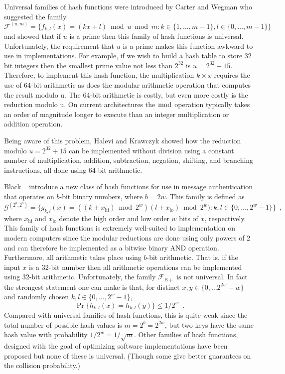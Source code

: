 \documentclass[lotsofwhite,charterfonts]{patmorin}
\begin{document}
Universal families of hash functions were introduced by Carter and
Wegman \cite{cwXX} who suggested the family
\[
\mathcal{F}^{(u,m)} = \{f_{k,l}(x)=(kx+l)\bmod u\bmod m  :
k\in\{1,\ldots,m-1\}, l\in\{0,\ldots,m-1\} \}
\]
and showed that if $u$ is a prime then this family of hash functions
is universal.  Unfortunately, the requirement that $u$ is a prime
makes this function awkward to use in implementations.  For example,
if we wish to build a hash table to store 32 bit integers then the
smallest prime value not less than $2^{32}$ is $u=2^{32}+15$.
Therefore, to implement this hash function, the multiplication
$k\times x$ requires the use of 64-bit arithmetic as does the modular
arithmetic operation that computes the result modulo u.  The 64-bit
arithmetic is costly, but even more costly is the reduction modulo u.
On current architectures the $\bmod$ operation typically takes an order of
magnitude longer to execute than an integer multiplication or addition
operation. 

Being aware of this problem, Halevi and Krawczyk \cite{X} showed how
the reduction modulo $u=2^{32}+15$ can be implemented without division
using a constant number of multiplication, addition, subtraction,
negation, shifting, and branching instructions, all done using 64-bit
arithmetic.

Black \etal\ \cite{X} introduce a new class of hash functions for use
in message authentication that operates on $b$-bit binary numbers,
where $b=2w$.  This family is defined as
\[
	\mathcal{G}^{(2^b,2^b)} = \{ g_{k,l}(x) = ((k+x_\mathrm{hi})\bmod
2^w)(l+x_\mathrm{lo})\bmod 2^w) : k,l\in\{0,\ldots,2^w-1\} \}	\enspace ,
\]
where $x_\mathrm{hi}$ and $x_\mathrm{lo}$ denote the high order and
low order $w$ bits of $x$, respectively.  This family of hash
functions is extremely well-suited to implementation on modern
computers since the modular reductions are done using only powers of 2 and can
therefore be implemented as a bitwise binary AND operation.
Furthermore, all arithmetic takes place using $b$-bit arithmetic.
That is, if the input $x$ is a 32-bit number then all arithmetic
operations can be implemented using 32-bit arithmetic.  Unfortunately,
the family $\mathcal{F}_\mathrm{B+}$ is not universal.  In fact the
strongest statement one can make is that, for distinct $x,y\in
\{0,\ldots2^{2w}-w\}$ and randomly chosen $k,l\in\{0,\ldots,2^{w}-1\}$,
\[ 
    \Pr\{h_{k,l}(x)=h_{k,l}(y)\} \le 1/2^w \enspace .  
\] 
Compared with universal families of hash functions, this is quite weak
since the total number of possible hash values is $m=2^b=2^{2w}$, but
two keys have the same hash value with probability $1/2^w=1/\sqrt{m}$.
Other families of hash functions, designed with the goal of optimizing
software implementations have been proposed \cite{X,X,X,X,X} but none
of these is universal. (Though some give better guarantees on the
collision probability.)
\end{document}
